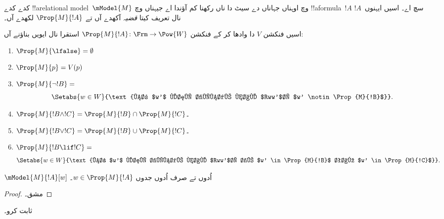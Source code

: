 \documentclass[../../../include/open-logic-section]{subfiles}
\begin{document}


کدے کدے !!a{relational model}~$\mModel{M}$ وچ اوہناں جہاناں دے سیٹ دا ناں رکھنا کم آؤندا اے جیہناں وچ !!a{formula}~$!A$ سچ اے۔ اسیں ایہنوں~$!A$ نال تعریف کیتا \emph{قضیہ} آکھدے آں تے $\Prop{M}{!A}$ لکھدے آں۔

\begin{defn}
  اسیں فنکشن $V$ دا وادھا کر کے فنکشن $\Prop{M}{!A} \colon \Frm
  \to \Pow{W}$ استقرا نال ایویں بناؤنے آں:
  \begin{enumerate}
  \item $\Prop{M}{\lfalse} = \emptyset$
  \item $\Prop{M}{p} = V(p)$
  \item $\Prop{M}{\lnot !B} = {}$
    \[
      \Setabs{w \in W}{\text{ہر $w'$ لئی جیہدے نال $Rww'$، $w'
          \notin \Prop{M}{!B}$}}.
    \]
  \item $\Prop{M}{!B \land !C} = \Prop{M}{!B} \cap \Prop{M}{!C}$۔
  \item $\Prop{M}{!B \lor !C} = \Prop{M}{!B} \cup \Prop{M}{!C}$۔
  \item $\Prop{M}{!B \lif !C} = {}$
    \[
      \Setabs{w \in W}{\text{ہر $w'$ لئی جیہدے نال $Rww'$، جے $w'
          \in \Prop{M}{!B}$ تاں $w' \in \Prop{M}{!C}$}}.
    \]
  \end{enumerate}
\end{defn}

\begin{prop}
  $\mModel{M}{!A}[w]$ اُدوں تے صرف اُدوں جدوں $w \in \Prop{M}{!A}$۔
\end{prop}

\begin{proof}
  مشق۔
\end{proof}

\begin{prob}
   ثابت کرو۔
\end{prob}
\end{document}
